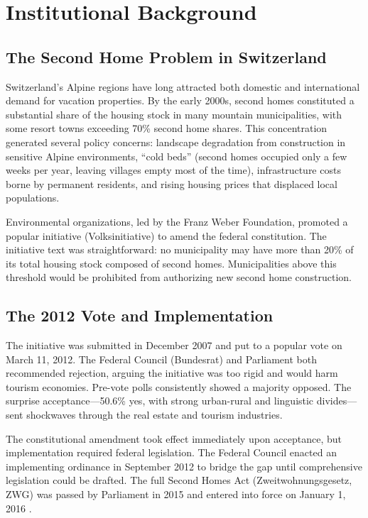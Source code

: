 \documentclass[12pt]{article}
\begin{document}
\section{Institutional Background}\label{sec:background}

\subsection{The Second Home Problem in Switzerland}

Switzerland's Alpine regions have long attracted both domestic and international demand for vacation properties. By the early 2000s, second homes constituted a substantial share of the housing stock in many mountain municipalities, with some resort towns exceeding 70\% second home shares. This concentration generated several policy concerns: landscape degradation from construction in sensitive Alpine environments, ``cold beds'' (second homes occupied only a few weeks per year, leaving villages empty most of the time), infrastructure costs borne by permanent residents, and rising housing prices that displaced local populations.

Environmental organizations, led by the Franz Weber Foundation, promoted a popular initiative (Volksinitiative) to amend the federal constitution. The initiative text was straightforward: no municipality may have more than 20\% of its total housing stock composed of second homes. Municipalities above this threshold would be prohibited from authorizing new second home construction.

\subsection{The 2012 Vote and Implementation}

The initiative was submitted in December 2007 and put to a popular vote on March 11, 2012. The Federal Council (Bundesrat) and Parliament both recommended rejection, arguing the initiative was too rigid and would harm tourism economies. Pre-vote polls consistently showed a majority opposed. The surprise acceptance---50.6\% yes, with strong urban-rural and linguistic divides---sent shockwaves through the real estate and tourism industries.

The constitutional amendment took effect immediately upon acceptance, but implementation required federal legislation. The Federal Council enacted an implementing ordinance in September 2012 to bridge the gap until comprehensive legislation could be drafted. The full Second Homes Act (Zweitwohnungsgesetz, ZWG) was passed by Parliament in 2015 and entered into force on January 1, 2016 \citep{zwg2015}.
\end{document}
